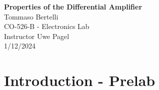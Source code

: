\documentclass{article}
\begin{document}
	
	\mbox{}
	\vspace{10cm}
	\begin{center}
		\textbf{\Huge{Properties of the Differential Amplifier}}\\
		\bigskip
		\Large{Tommaso Bertelli}\\
		\bigskip
		\Large{CO-526-B - Electronics Lab}\\
		\bigskip
		\Large{Instructor Uwe Pagel}\\
		\bigskip
		\Large{1/12/2024}\\
	\end{center}
	\pagebreak
	
	\section{Introduction - Prelab}
\end{document}
